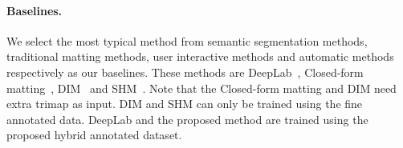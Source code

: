 \documentclass[10pt,twocolumn,letterpaper]{article}
\begin{document}
\paragraph{Baselines.} We select the most typical method from semantic segmentation methods, traditional matting methods, user interactive methods and automatic methods respectively as our baselines. These methods are DeepLab~\cite{chen2017rethinking}, Closed-form matting~\cite{levin2007closed}, DIM~\cite{aksoy2017designing} and SHM~\cite{chen2018semantic}. Note that the Closed-form matting and DIM need extra trimap as input. DIM and SHM can only be trained using the fine annotated data. DeepLab and the proposed method are trained using the proposed hybrid annotated dataset.

\begin{table}[t]
  \centering\scriptsize
    \caption{The quantitative results.}
  \label{tab:quantitative}
\end{table}
\end{document}

